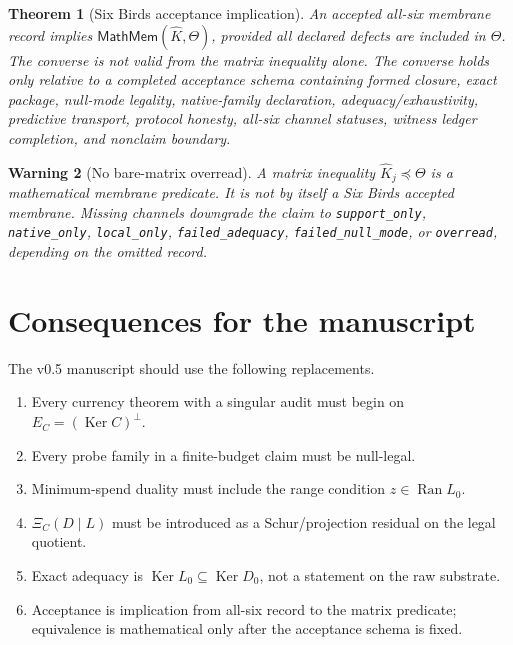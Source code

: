 \documentclass[11pt]{article}
\newtheorem{theorem}{Theorem}[section]
\newtheorem{warning}[theorem]{Warning}
\DeclareMathOperator{\Ran}{Ran}
\DeclareMathOperator{\Ker}{Ker}
\begin{document}
\begin{theorem}[Six Birds acceptance implication]
An accepted all-six membrane record implies \(\mathsf{MathMem}(\widehat K,\Theta)\), provided all declared defects are included in \(\Theta\).  The converse is not valid from the matrix inequality alone.  The converse holds only relative to a completed acceptance schema containing formed closure, exact package, null-mode legality, native-family declaration, adequacy/exhaustivity, predictive transport, protocol honesty, all-six channel statuses, witness ledger completion, and nonclaim boundary.
\end{theorem}

\begin{warning}[No bare-matrix overread]
A matrix inequality \(\widehat K_j\preceq\Theta\) is a mathematical membrane predicate.  It is not by itself a Six Birds accepted membrane.  Missing channels downgrade the claim to \texttt{support\_only}, \texttt{native\_only}, \texttt{local\_only}, \texttt{failed\_adequacy}, \texttt{failed\_null\_mode}, or \texttt{overread}, depending on the omitted record.
\end{warning}

\section{Consequences for the manuscript}

The v0.5 manuscript should use the following replacements.
\begin{enumerate}[label=\textbf{R\arabic*.},leftmargin=2em]
\item Every currency theorem with a singular audit must begin on \(E_C=(\Ker C)^\perp\).
\item Every probe family in a finite-budget claim must be null-legal.
\item Minimum-spend duality must include the range condition \(z\in\Ran L_0\).
\item \(\Xi_C(D\mid L)\) must be introduced as a Schur/projection residual on the legal quotient.
\item Exact adequacy is \(\Ker L_0\subseteq\Ker D_0\), not a statement on the raw substrate.
\item Acceptance is implication from all-six record to the matrix predicate; equivalence is mathematical only after the acceptance schema is fixed.
\end{enumerate}
\end{document}

